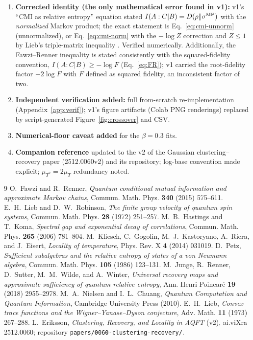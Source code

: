 \documentclass[11pt]{article}
\begin{document}
\begin{enumerate}
\item \textbf{Corrected identity (the only mathematical error found in v1):}
v1's ``CMI as relative entropy'' equation stated
$I(A:C|B) = D(\rho\|\sigma^{\rm MP})$ with the \emph{normalized} Markov
product; the exact statement is Eq.~\eqref{eq:cmi-unnorm} (unnormalized), or
Eq.~\eqref{eq:cmi-norm} with the $-\log Z$ correction and $Z \le 1$ by Lieb's
triple-matrix inequality \cite{Lieb73}. Verified numerically.
Additionally, the Fawzi--Renner inequality is stated consistently with the
squared-fidelity convention, $I(A:C|B) \ge -\log F$ (Eq.~\eqref{eq:FR}); v1
carried the root-fidelity factor $-2\log F$ with $F$ defined as squared
fidelity, an inconsistent factor of two.
\item \textbf{Independent verification added:} full from-scratch
re-implementation (Appendix~\ref{app:verif}); v1's figure artifacts (Colab
PNG renderings) replaced by script-generated Figure~\ref{fig:crossover} and
CSV.
\item \textbf{Numerical-floor caveat added} for the $\beta = 0.3$ fits.
\item \textbf{Companion reference} updated to the v2 of the Gaussian
clustering--recovery paper (2512.0060v2) and its repository; log-base
convention made explicit; $\mu_{T^2} = 2\mu_T$ redundancy noted.
\end{enumerate}

\begin{thebibliography}{9}
 O.~Fawzi and R.~Renner, \emph{Quantum conditional mutual
information and approximate Markov chains}, Commun. Math. Phys.
\textbf{340} (2015) 575--611.
 E.~H.~Lieb and D.~W.~Robinson, \emph{The finite group velocity of
quantum spin systems}, Commun. Math. Phys. \textbf{28} (1972) 251--257.
 M.~B.~Hastings and T.~Koma, \emph{Spectral gap and exponential
decay of correlations}, Commun. Math. Phys. \textbf{265} (2006) 781--804.
 M.~Kliesch, C.~Gogolin, M.~J.~Kastoryano, A.~Riera, and
J.~Eisert, \emph{Locality of temperature}, Phys. Rev. X \textbf{4} (2014)
031019.
 D.~Petz, \emph{Sufficient subalgebras and the relative entropy
of states of a von Neumann algebra}, Commun. Math. Phys. \textbf{105} (1986)
123--131.
 M.~Junge, R.~Renner, D.~Sutter, M.~M.~Wilde, and A.~Winter,
\emph{Universal recovery maps and approximate sufficiency of quantum relative
entropy}, Ann. Henri Poincar\'e \textbf{19} (2018) 2955--2978.
 M.~A.~Nielsen and I.~L.~Chuang, \emph{Quantum Computation and
Quantum Information}, Cambridge University Press (2010).
 E.~H.~Lieb, \emph{Convex trace functions and the
Wigner--Yanase--Dyson conjecture}, Adv. Math. \textbf{11} (1973) 267--288.
 L.~Eriksson, \emph{Clustering, Recovery, and Locality
in AQFT} (v2), ai.viXra 2512.0060; repository
\texttt{papers/0060-clustering-recovery/}.
\end{thebibliography}
\end{document}
